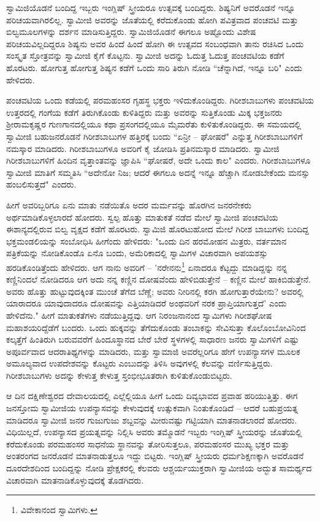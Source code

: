 ಸ್ವಾಮಿಜಿಯೊಡನೆ ಬಂದಿದ್ದ ಇಬ್ಬರು ಇಂಗ್ಲಿಷ್ ಸ್ತ್ರೀಯರೂ ಉತ್ಸವಕ್ಕೆ ಬಂದಿದ್ದರು. ಶಿಷ್ಯನಿಗೆ ಅವರೊಡನೆ ಇನ್ನೂ ಪರಿಚಯವಾಗಿರಲಿಲ್ಲ. ಸ್ವಾಮೀಜಿ ಅವರನ್ನು ಜೊತೆಯಲ್ಲಿ ಕರೆದುಕೊಂಡು ಹೋಗಿ ಪವಿತ್ರವಾದ ಪಂಚವಟಿ ಮತ್ತು ಬಿಲ್ವಮೂಲಗಳನ್ನು ದರ್ಶನ ಮಾಡಿಸುತ್ತಿದ್ದರು. ಸ್ವಾಮಿಜಿಯೊಡನೆ ಈಗಲೂ ಅಷ್ಟೊಂದು ವಿಶೇಷ ಪರಿಚಯವಿಲ್ಲದಿದ್ದರೂ ಶಿಷ್ಯನು ಅವರ ಹಿಂದೆ ಹಿಂದೆ ಹೋಗಿ ಈ ಉತ್ಸವದ ಸಂಬಂಧವಾಗಿ ತಾನು ರಚಿಸಿದ ಒಂದು ಸಂಸ್ಕೃತ ಸ್ತೋತ್ರವನ್ನು ಸ್ವಾಮೀಜಿ ಕೈಗೆ ಕೊಟ್ಟನು. ಸ್ವಾಮೀಜಿ ಅದನ್ನು ಓದುತ್ತ ಓದುತ್ತ ಪಂಚವಟಿಯ ಕಡೆಗೆ ಹೊರಟರು. ಹೋಗುತ್ತ ಹೋಗುತ್ತ ಶಿಷ್ಯನ ಕಡೆಗೆ ಒಂದು ಸಾರಿ ತಿರುಗಿ ನೋಡಿ “ಚೆನ್ನಾಗಿದೆ, ಇನ್ನೂ ಬರಿ" ಎಂದು ಹೇಳಿದರು.

ಪಂಚವಟಿಯ ಒಂದು ಕಡೆಯಲ್ಲಿ ಪರಮಹಂಸರ ಗೃಹಸ್ಥ ಭಕ್ತರು ಇಳಿದುಕೊಂಡಿದ್ದರು. ಗಿರೀಶಬಾಬುಗಳು ಪಂಚವಟಿಯ ಉತ್ತರದಲ್ಲಿ ಗಂಗೆಯ ಕಡೆಗೆ ತಿರುಗಿಕೊಂಡು ಕುಳಿತಿದ್ದರು ಮತ್ತು ಅವರನ್ನು ಸುತ್ತಿಕೊಂಡು ಮಿಕ್ಕ ಭಕ್ತಜನರು ಶ‍್ರೀರಾಮಕೃಷ್ಣರ ಗುಣಗಾನದಲ್ಲಿಯೂ ಕಥಾ ಪ್ರಸಂಗದಲ್ಲಿಯೂ ಮೈಮರೆತು ಕುಳಿತುಕೊಂಡಿದ್ದರು. ಈ ಸಮಯದಲ್ಲಿ ಸ್ವಾಮೀಜಿ ಬಹುಜನರೊಡನೆ ಗಿರೀಶಬಾಬುಗಳ ಹತ್ತಿರಕ್ಕೆ ಬಂದು “ಏನ್ರೀ – ಘೋಷರೆ" ಎನ್ನುತ್ತ ಗಿರೀಶಬಾಬುಗಳಿಗೆ ನಮಸ್ಕಾರ ಮಾಡಿದರು. ಗಿರೀಶಬಾಬುಗಳೂ ಅವರಿಗೆ ಕೈ ಜೋಡಿಸಿ ಪ್ರತಿನಮಸ್ಕಾರ ಮಾಡಿದರು. ಸ್ವಾಮೀಜಿ ಗಿರೀಶಬಾಬುಗಳಿಗೆ ಹಿಂದಿನ ವೃತ್ತಾಂತವನ್ನು ಜ್ಞಾಪಿಸಿ “ಘೋಷರೆ, ಅದೇ ಒಂದು ಕಾಲ" ಎಂದರು. ಗಿರೀಶಬಾಬುಗಳೂ ಸ್ವಾಮೀಜಿ ಮಾತಿಗೆ ಸಮ್ಮತಿಸಿ “ಅದೇನೋ ನಿಜ; ಆದರೆ ಈಗಲೂ ಅದನ್ನೆ ಇನ್ನೂ ಹೆಚ್ಚಾಗಿ ನೋಡಬೇಕೆಂದು ಮನಸ್ಸು ಹಂಬಲಿಸುತ್ತದೆ" ಎಂದರು.

ಹೀಗೆ ಅವರಿಬ್ಬರಿಗೂ ಏನು ಮಾತು ನಡೆಯಿತೊ ಅದರ ಮರ್ಮವನ್ನು ಹೊರಗಿನ ಜನರನೇಕರು ಅರ್ಥಮಾಡಿಕೊಳ್ಳಲಾರದೆ ಹೋದರು. ಸ್ವಲ್ಪ ಹೊತ್ತು ಮಾತುಕತೆ ನಡೆದ ಮೇಲೆ ಸ್ವಾಮೀಜಿ ಪಂಚವಟಿಯ ಈಶಾನ್ಯದಲ್ಲಿರುವ ಬಿಲ್ವ ವೃಕ್ಷದ ಕಡೆಗೆ ಹೊರಟರು. ಸ್ವಾಮಿಜಿ ಹೊರಟುಹೋದ ಮೇಲೆ ಗಿರೀಶ ಬಾಬುಗಳು ಬಂದಿದ್ದ ಭಕ್ತಮಂಡಲಿಯನ್ನು ಸಂಬೋಧಿಸಿ ಹೀಗೆಂದು ಹೇಳಿದರು: "ಒಂದು ದಿನ ಹರಮೋಹನ ಮಿತ್ರರು, ವರ್ತಮಾನ ಪತ್ರಿಕೆಯನ್ನು ನೋಡಿಕೊಂಡೊ ಏನೊ ಬಂದು, ಅಮೆರಿಕಾದಲ್ಲಿ ಸ್ವಾಮಿಗಳ ವಿಚಾರವಾಗಿ ಅಪಯಶಸ್ಸು ಹರಡಿಕೊಂಡಿತ್ತೆಂದು ಹೇಳಿದರು. ಆಗ ನಾನು ಅವರಿಗೆ – 'ನರೇನನು\footnote{ವಿವೇಕಾನಂದ ಸ್ವಾಮಿಗಳು.} ಏನಾದರೂ ಕೆಟ್ಟದ್ದು ಮಾಡಿದ್ದನ್ನು ನನ್ನ ಕಣ್ಣಿನಿಂದಲೆ ನೋಡಿದರೂ ಆಗ ಅದು ನನ್ನ ಕಣ್ಣಿನ ದೋಷವೆಂದು ಹೇಳಿಬಿಡುತ್ತೇನೆ – ಕಣ್ಣಿನ ಮೇಲೆ ಹಾಕಿಬಿಡುತ್ತೇನೆ. ಅವರು ಹೊತ್ತು ಹುಟ್ಟುವುದಕ್ಕಿಂತ ಮುಂಚೆ ತೆಗೆದ ಬೆಣ್ಣೆ; ಅವರು ನೀರಿನಲ್ಲಿ ಕರಗಿ ಹೋಗುತ್ತಾರೆಯೇನು? ಅವರಲ್ಲಿ ಯಾರಾದರೂ ಯಾವುದಾದರೂ ದೋಷವನ್ನು ಎತ್ತಿಯಾಡಿದರೆ ಅಂಥವರಿಗೆ ನರಕ ಪ್ರಾಪ್ತಿಯಾಗುತ್ತದೆ' ಎಂದು ಹೇಳಿದೆನು." ಹೀಗೆ ಮಾತುಕತೆಗಳು ನಡೆಯುತ್ತಿದ್ದವು. ಆಗ ನಿರಂಜನಾನಂದ ಸ್ವಾಮಿಗಳು ಗಿರೀಶಘೋಷ ಮಹಾಶಯರಿದ್ದೆಡೆಗೆ ಬಂದರು. ಒಂದು ಹುಕ್ಕವನ್ನು ತೆಗೆದುಕೊಂಡು ತಂಬಾಕನ್ನು ಸೇವಿಸುತ್ತಾ ಕೊಲೊಂಬೋವಿನಿಂದ ಕಲ್ಕತ್ತೆಗೆ ಹಿಂತಿರುಗಿ ಬರುವವರೆಗೆ ಹಿಂದೂಸ್ಥಾನದ ಬೇರೆ ಬೇರೆ ಸ್ಥಳಗಳಲ್ಲಿ ಸಾಧಾರಣ ಜನರು ಸ್ವಾಮಿಗಳಿಗೆ ಎಷ್ಟು ಅಪೂರ್ವವಾದ ಆದರಾತಿಥ್ಯಗಳನ್ನು ಮಾಡಿದರು, ಮತ್ತು ಸ್ವಾಮಾಜಿ ಅವರೆಲ್ಲರಿಗೂ ಹೇಗೆ ಉಪನ್ಯಾಸಗಳ ಮೂಲಕ ಅಮೂಲ್ಯವಾದ ಉಪದೇಶವನ್ನು ಕೊಟ್ಟರು ಎಂಬುದನ್ನು ತಿಳಿಸಿ ಅವುಗಳಲ್ಲಿ ಕೆಲವನ್ನು ವರ್ಣಿಸುತ್ತಿದ್ದರು. ಗಿರೀಶಬಾಬುಗಳು ಅದನ್ನು ಕೇಳುತ್ತ ಕೇಳುತ್ತ ಸ್ತಂಭೀಭೂತರಾಗಿ ಕುಳಿತುಕೊಂಡುಬಿಟ್ಟರು.

ಆ ದಿನ ದಕ್ಷಿಣೇಶ್ವರದ ದೇವಾಲಯದಲ್ಲಿ ಎಲ್ಲೆಲ್ಲಿಯೂ ಹೀಗೆ ಒಂದು ದಿವ್ಯಭಾವದ ಪ್ರವಾಹ ಹರಿಯುತ್ತಿತ್ತು. ಈಗ ಜನಸ್ತೋಮ ಸ್ವಾಮೀಜಿಯ ಉಪನ್ಯಾಸವನ್ನು ಕೇಳುವುದಕ್ಕೆ ಉತ್ಸುಕವಾಗಿ ನಿಂತುಕೊಂಡಿದೆ – ಆದರೆ ಬಹುಪ್ರಯತ್ನ ಮಾಡಿದರೂ ಸ್ವಾಮೀಜಿ ಜನರ ಗುಜುಗುಜು ಶಬ್ದವನ್ನು ಮೀರುವಷ್ಟು ಗಟ್ಟಿಯಾಗಿ ಮಾತನಾಡಲಾರದೆ ಹೋದರು. ವಿಧಿಯಿಲ್ಲದೆ, ಉಪನ್ಯಾಸದ ಪ್ರಯತ್ನವನ್ನು ನಿಲ್ಲಿಸಿ ಅವರು ತಮ್ಮೊಡನೆ ಇಬ್ಬರು ಇಂಗ್ಲಿಷ್ ಸ್ತ್ರೀಯರನ್ನು ಜೊತೆಯಲ್ಲಿ ಕರೆದುಕೊಂಡು ಪರಮಹಂಸರ ಸಾಧನೆಯ ಸ್ಥಾನವನ್ನು ತೋರಿಸುತ್ತಲೂ, ಪರಮಹಂಸರ ಮುಖ್ಯ ಭಕ್ತರ ಮತ್ತು ಅಂತರಂಗದ ಜನರೊಡನೆ ಮಾತನಾಡುತ್ತಲೂ ಇದ್ದು ಬಿಟ್ಟರು. ಇಂಗ್ಲಿಷ್ ಸ್ತ್ರೀಯರು ಧರ್ಮಶಿಕ್ಷಣಕ್ಕಾಗಿ ಅವರೊಡನೆ ದೂರದೇಶದಿಂದ ಬಂದಿದ್ದನ್ನು ನೋಡಿ ಪ್ರೇಕ್ಷಕರಲ್ಲಿ ಕೆಲವರು ಆಶ್ಚರ್ಯಯುಕ್ತರಾಗಿ ಸ್ವಾಮೀಜಿಯ ಅದ್ಭುತ ಸಾಮರ್ಥ್ಯದ ವಿಚಾರವಾಗಿ ಮಾತನಾಡಿಕೊಳ್ಳುವುದಕ್ಕೆ ತೊಡಗಿದರು.

